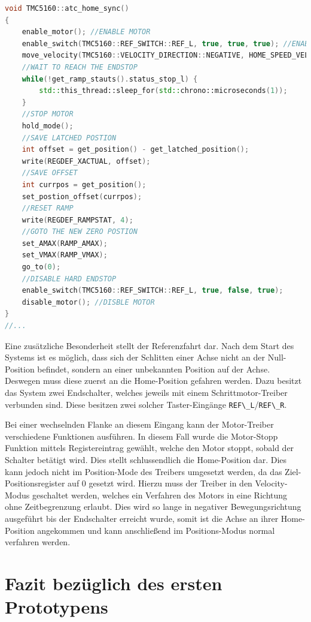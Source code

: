 \begin{lstlisting}[language={C++}]
void TMC5160::atc_home_sync()
{   
    enable_motor(); //ENABLE MOTOR
    enable_switch(TMC5160::REF_SWITCH::REF_L, true, true, true); //ENABLE LIMIT SWICHT => ENABLE HARD ENDSTOP
    move_velocity(TMC5160::VELOCITY_DIRECTION::NEGATIVE, HOME_SPEED_VELOCITY, 1000);  //MOVE NEGATIVE TO LIMIT SWITCH
    //WAIT TO REACH THE ENDSTOP
    while(!get_ramp_stauts().status_stop_l) {
        std::this_thread::sleep_for(std::chrono::microseconds(1));      
    }
    //STOP MOTOR
    hold_mode();
    //SAVE LATCHED POSTION
    int offset = get_position() - get_latched_position();
    write(REGDEF_XACTUAL, offset);
    //SAVE OFFSET
    int currpos = get_position();
    set_postion_offset(currpos);
    //RESET RAMP
    write(REGDEF_RAMPSTAT, 4);
    //GOTO THE NEW ZERO POSTION
    set_AMAX(RAMP_AMAX);
    set_VMAX(RAMP_VMAX);
    go_to(0);
    //DISABLE HARD ENDSTOP 
    enable_switch(TMC5160::REF_SWITCH::REF_L, true, false, true);
    disable_motor(); //DISBLE MOTOR
}
//...
\end{lstlisting}

Eine zusätzliche Besonderheit stellt der Referenzfahrt dar. Nach dem
Start des Systems ist es möglich, dass sich der Schlitten einer Achse
nicht an der Null-Position befindet, sondern an einer unbekannten
Position auf der Achse. Deswegen muss diese zuerst an die Home-Position
gefahren werden. Dazu besitzt das System zwei Endschalter, welches
jeweils mit einem Schrittmotor-Treiber verbunden sind. Diese besitzen
zwei solcher Taster-Eingänge
\passthrough{\lstinline!REF\_L!}/\passthrough{\lstinline!REF\_R!}.

Bei einer wechselnden Flanke an diesem Eingang kann der Motor-Treiber
verschiedene Funktionen ausführen. In diesem Fall wurde die Motor-Stopp
Funktion mittels Registereintrag gewählt, welche den Motor stoppt,
sobald der Schalter betätigt wird. Dies stellt schlussendlich die
Home-Position dar. Dies kann jedoch nicht im Position-Mode des Treibers
umgesetzt werden, da das Ziel-Positionsregister auf 0 gesetzt wird.
Hierzu muss der Treiber in den Velocity-Modus geschaltet werden, welches
ein Verfahren des Motors in eine Richtung ohne Zeitbegrenzung erlaubt.
Dies wird so lange in negativer Bewegungsrichtung ausgeführt bis der
Endschalter erreicht wurde, somit ist die Achse an ihrer Home-Position
angekommen und kann anschließend im Positions-Modus normal verfahren
werden.

\hypertarget{fazit-bezuxfcglich-des-ersten-prototypens}{%
\section{Fazit bezüglich des ersten
Prototypens}\label{fazit-bezuxfcglich-des-ersten-prototypens}}

